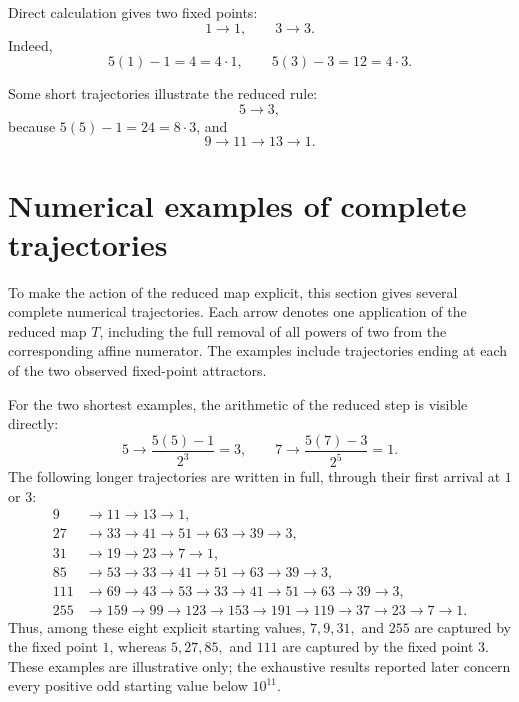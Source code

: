 \documentclass[11pt]{article}
\begin{document}
Direct calculation gives two fixed points:
\[
1\longrightarrow1,\qquad 3\longrightarrow3.
\]
Indeed,
\[
5(1)-1=4=4\cdot1,\qquad
5(3)-3=12=4\cdot3.
\]

Some short trajectories illustrate the reduced rule:
\[
5\longrightarrow3,
\]
because $5(5)-1=24=8\cdot3$, and
\[
9\longrightarrow11\longrightarrow13\longrightarrow1.
\]

\section{Numerical examples of complete trajectories}

To make the action of the reduced map explicit, this section gives several complete numerical trajectories. Each arrow denotes one application of the reduced map $T$, including the full removal of all powers of two from the corresponding affine numerator. The examples include trajectories ending at each of the two observed fixed-point attractors.

For the two shortest examples, the arithmetic of the reduced step is visible directly:
\[
5\longrightarrow \frac{5(5)-1}{2^3}=3,
\qquad
7\longrightarrow \frac{5(7)-3}{2^5}=1.
\]
The following longer trajectories are written in full, through their first arrival at $1$ or $3$:
\begin{align*}
9&\longrightarrow11\longrightarrow13\longrightarrow1,\\
27&\longrightarrow33\longrightarrow41\longrightarrow51\longrightarrow63\longrightarrow39\longrightarrow3,\\
31&\longrightarrow19\longrightarrow23\longrightarrow7\longrightarrow1,\\
85&\longrightarrow53\longrightarrow33\longrightarrow41\longrightarrow51\longrightarrow63\longrightarrow39\longrightarrow3,\\
111&\longrightarrow69\longrightarrow43\longrightarrow53\longrightarrow33\longrightarrow41\longrightarrow51\longrightarrow63\longrightarrow39\longrightarrow3,\\
255&\longrightarrow159\longrightarrow99\longrightarrow123\longrightarrow153\longrightarrow191\longrightarrow119\longrightarrow37\longrightarrow23\longrightarrow7\longrightarrow1.
\end{align*}
Thus, among these eight explicit starting values, $7,9,31,$ and $255$ are captured by the fixed point $1$, whereas $5,27,85,$ and $111$ are captured by the fixed point $3$. These examples are illustrative only; the exhaustive results reported later concern every positive odd starting value below $10^{11}$.
\end{document}
